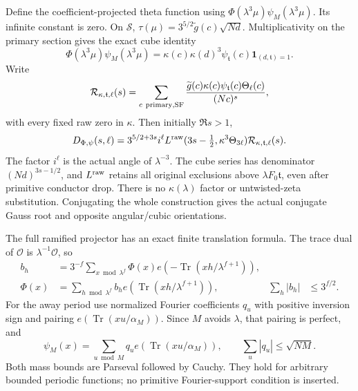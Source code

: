 Define the coefficient-projected theta function using
\(\Phi(\lambda^3\mu)\psi_M(\lambda^3\mu)\).
Its infinite constant is zero. On \(\mathcal S\),
\(\tau(\mu)=3^{5/2}\widetilde g(c)\sqrt{Nd}\).
Multiplicativity on the primary section gives the exact cube identity
\begin{equation}\label{rg:cube-coefficients}
 \Phi(\lambda^3\mu)\psi_M(\lambda^3\mu)
 =\kappa(c)\kappa(d)^3\psi_{\mathfrak t}(c)
                                    \mathbf1_{(d,\mathfrak t)=1}.
\end{equation}
Write
\begin{equation}\label{rg:gauss-dirichlet}
 \mathcal R_{\kappa,\mathfrak t,\ell}(s)
 =\sum_{c\ {\rm primary,SF}}
 \frac{\widetilde g(c)\kappa(c)\psi_{\mathfrak t}(c)
                                  \Theta_\ell(c)}{(Nc)^s},
\end{equation}
with every fixed raw zero in \(\kappa\). Then initially \(\Re s>1\),
\begin{equation}\label{rg:cube-completion}
 D_{\Phi,\psi}(s,\ell)
 =3^{5/2+3s}i^\ell
 L^{\rm raw}(3s-\tfrac12,\kappa^3\Theta_{3\ell})
                       \mathcal R_{\kappa,\mathfrak t,\ell}(s).
\end{equation}
The factor \(i^\ell\) is the actual angle of \(\lambda^{-3}\).
The cube series has denominator \((Nd)^{3s-1/2}\), and
\(L^{\rm raw}\) retains all original exclusions above
\(\lambda F_0\mathfrak t\), even after primitive conductor drop.
There is no \(\kappa(\lambda)\) factor or untwisted-zeta substitution.
Conjugating the whole construction gives the actual conjugate
Gauss root and opposite angular/cubic orientations.

The full ramified projector has an exact finite translation formula.
The trace dual of \(\mathcal O\) is \(\lambda^{-1}\mathcal O\), so
\begin{equation}\label{rg:ramified-fourier}
 \begin{aligned}
 b_h&=3^{-f}\sum_{x\bmod\lambda^f}
         \Phi(x)e(-\operatorname{Tr}(xh/\lambda^{f+1})),\\
 \Phi(x)&=\sum_{h\bmod\lambda^f}
                  b_he(\operatorname{Tr}(xh/\lambda^{f+1})),&
 \sum_h|b_h|&\le3^{f/2}.
 \end{aligned}
\end{equation}
For the away period use normalized Fourier coefficients \(q_u\)
with positive inversion sign and pairing
\(e(\operatorname{Tr}(xu/\alpha_M))\).
Since \(M\) avoids \(\lambda\), that pairing is perfect, and
\begin{equation}\label{rg:away-fourier}
 \psi_M(x)=\sum_{u\bmod M}q_u e(\operatorname{Tr}(xu/\alpha_M)),
 \qquad
 \sum_u|q_u|\le\sqrt{NM}.
\end{equation}
Both mass bounds are Parseval followed by Cauchy.
They hold for arbitrary bounded periodic functions; no primitive
Fourier-support condition is inserted.

